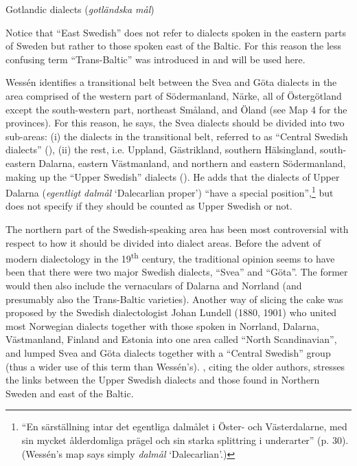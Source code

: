 \item 

Gotlandic dialects (\textit{gotländska mål})



Notice that “East Swedish” does not refer to dialects spoken in the eastern parts of Sweden but rather to those spoken east of the Baltic. For this reason the less confusing term “Trans-Baltic” was introduced in \citet{Rendahl2001} and will be used here.


Wessén identifies a transitional belt between the Svea and Göta dialects in the area comprised of the western part of Södermanland, Närke, all of Östergötland except the south-western part, northeast Småland, and Öland (see Map 4 for the provinces). For this reason, he says, the Svea dialects should be divided into two sub-areas: (i) the dialects in the transitional belt, referred to as “Central Swedish dialects” (), (ii) the rest, i.e. Uppland, Gästrikland, southern Hälsingland, south-eastern Dalarna, eastern Västmanland, and northern and eastern Södermanland, making up the “Upper Swedish” dialects (). He adds that the dialects of Upper Dalarna (\textit{egentligt dalmål} ‘Dalecarlian proper’) \label{bkm:wessenquote}“have a special position”,\footnote{\textsuperscript{ }“En särställning intar det egentliga dalmålet i Öster- och Västerdalarne, med sin mycket ålderdomliga prägel och sin starka splittring i underarter” (p. 30).  (Wessén’s map says simply \textit{dalmål} ‘Dalecarlian’.)} but does not specify if they should be counted as Upper Swedish or not.


The northern part of the Swedish-speaking area has been most controversial with respect to how it should be divided into dialect areas. Before the advent of modern dialectology in the 19\textsuperscript{th} century, the traditional opinion seems to have been that there were two major Swedish dialects, “Svea” and “Göta”. The former would then also include the vernaculars of Dalarna and Norrland (and presumably also the Trans-Baltic varieties). Another way of slicing the cake was proposed by the Swedish dialectologist Johan Lundell (1880, 1901) who united most Norwegian dialects together with those spoken in Norrland, Dalarna, Västmanland, Finland and Estonia into one area called “North Scandinavian”, and lumped Svea and Göta dialects together with a “Central Swedish” group (thus a wider use of this term than Wessén’s). \citet{Hesselman1905}, citing the older authors, stresses the links between the Upper Swedish dialects and those found in Northern Sweden and east of the Baltic. 

